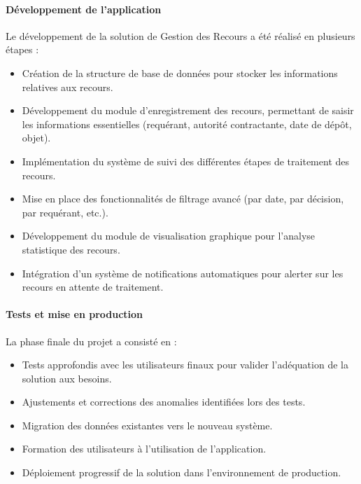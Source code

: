 \paragraph{Développement de l'application}
Le développement de la solution de Gestion des Recours a été réalisé en plusieurs étapes :
\begin{itemize}
    \item Création de la structure de base de données pour stocker les informations relatives aux recours.
    \item Développement du module d'enregistrement des recours, permettant de saisir les informations essentielles (requérant, autorité contractante, date de dépôt, objet).
    \item Implémentation du système de suivi des différentes étapes de traitement des recours.
    \item Mise en place des fonctionnalités de filtrage avancé (par date, par décision, par requérant, etc.).
    \item Développement du module de visualisation graphique pour l'analyse statistique des recours.
    \item Intégration d'un système de notifications automatiques pour alerter sur les recours en attente de traitement.
\end{itemize}

\paragraph{Tests et mise en production}
La phase finale du projet a consisté en :
\begin{itemize}
    \item Tests approfondis avec les utilisateurs finaux pour valider l'adéquation de la solution aux besoins.
    \item Ajustements et corrections des anomalies identifiées lors des tests.
    \item Migration des données existantes vers le nouveau système.
    \item Formation des utilisateurs à l'utilisation de l'application.
    \item Déploiement progressif de la solution dans l'environnement de production.
\end{itemize}

